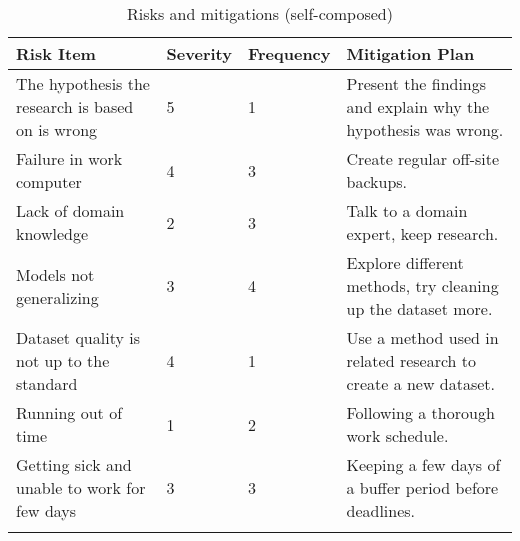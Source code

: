 \begin{longtable}{|p{4.8cm}|p{1.35cm}|p{1.8cm}|p{7cm}|}
    \hline
    \textbf{Risk Item} & 
    \textbf{Severity} & 
    \textbf{Frequency} & 
    \textbf{Mitigation Plan}
    \\ \hline
    
    The hypothesis the research is based on is wrong & 
    5 & 
    1 & 
    Present the findings and explain why the hypothesis was wrong.
    \\ \hline
    
    Failure in work computer & 
    4 & 
    3 & 
    Create regular off-site backups.
    \\ \hline
    
    Lack of domain knowledge & 
    2 & 
    3 & 
    Talk to a domain expert, keep research.
    \\ \hline
    
    Models not generalizing & 
    3 & 
    4 & 
    Explore different methods, try cleaning up the dataset more.
    \\ \hline
    
    Dataset quality is not up to the standard & 
    4 & 
    1 & 
    Use a method used in related research to create a new dataset.
    \\ \hline
    
    Running out of time & 
    1 & 
    2 & 
    Following a thorough work schedule.
    \\ \hline
    
    Getting sick and unable to work for few days & 
    3 & 
    3 & 
    Keeping a few days of a buffer period before deadlines.
    \\ \hline
    \caption{Risks and mitigations (self-composed)}
\end{longtable}